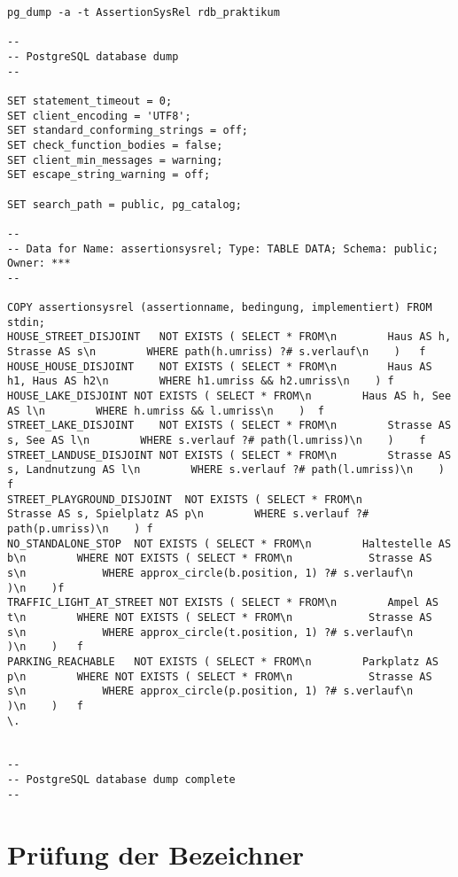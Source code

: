 \documentclass[a4paper]{article}
\begin{document}
\begin{lstlisting}[breaklines=true]
pg_dump -a -t AssertionSysRel rdb_praktikum

--
-- PostgreSQL database dump
--

SET statement_timeout = 0;
SET client_encoding = 'UTF8';
SET standard_conforming_strings = off;
SET check_function_bodies = false;
SET client_min_messages = warning;
SET escape_string_warning = off;

SET search_path = public, pg_catalog;

--
-- Data for Name: assertionsysrel; Type: TABLE DATA; Schema: public; Owner: ***
--

COPY assertionsysrel (assertionname, bedingung, implementiert) FROM stdin;
HOUSE_STREET_DISJOINT	NOT EXISTS ( SELECT * FROM\n        Haus AS h, Strasse AS s\n        WHERE path(h.umriss) ?# s.verlauf\n    )	f
HOUSE_HOUSE_DISJOINT	NOT EXISTS ( SELECT * FROM\n        Haus AS h1, Haus AS h2\n        WHERE h1.umriss && h2.umriss\n    )	f
HOUSE_LAKE_DISJOINT	NOT EXISTS ( SELECT * FROM\n        Haus AS h, See AS l\n        WHERE h.umriss && l.umriss\n    )	f
STREET_LAKE_DISJOINT	NOT EXISTS ( SELECT * FROM\n        Strasse AS s, See AS l\n        WHERE s.verlauf ?# path(l.umriss)\n    )	f
STREET_LANDUSE_DISJOINT	NOT EXISTS ( SELECT * FROM\n        Strasse AS s, Landnutzung AS l\n        WHERE s.verlauf ?# path(l.umriss)\n    )	f
STREET_PLAYGROUND_DISJOINT	NOT EXISTS ( SELECT * FROM\n        Strasse AS s, Spielplatz AS p\n        WHERE s.verlauf ?# path(p.umriss)\n    )	f
NO_STANDALONE_STOP	NOT EXISTS ( SELECT * FROM\n        Haltestelle AS b\n        WHERE NOT EXISTS ( SELECT * FROM\n            Strasse AS s\n            WHERE approx_circle(b.position, 1) ?# s.verlauf\n        )\n    )f
TRAFFIC_LIGHT_AT_STREET	NOT EXISTS ( SELECT * FROM\n        Ampel AS t\n        WHERE NOT EXISTS ( SELECT * FROM\n            Strasse AS s\n            WHERE approx_circle(t.position, 1) ?# s.verlauf\n        )\n    )	f
PARKING_REACHABLE	NOT EXISTS ( SELECT * FROM\n        Parkplatz AS p\n        WHERE NOT EXISTS ( SELECT * FROM\n            Strasse AS s\n            WHERE approx_circle(p.position, 1) ?# s.verlauf\n        )\n    )	f
\.


--
-- PostgreSQL database dump complete
--
\end{lstlisting}

\section{Prüfung der Bezeichner}
\end{document}
